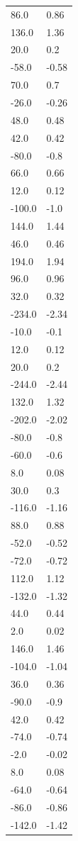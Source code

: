 \begin{longtable}{ll}
86.0 & 0.86 \\
136.0 & 1.36 \\
20.0 & 0.2 \\
-58.0 & -0.58 \\
70.0 & 0.7 \\
-26.0 & -0.26 \\
48.0 & 0.48 \\
42.0 & 0.42 \\
-80.0 & -0.8 \\
66.0 & 0.66 \\
12.0 & 0.12 \\
-100.0 & -1.0 \\
144.0 & 1.44 \\
46.0 & 0.46 \\
194.0 & 1.94 \\
96.0 & 0.96 \\
32.0 & 0.32 \\
-234.0 & -2.34 \\
-10.0 & -0.1 \\
12.0 & 0.12 \\
20.0 & 0.2 \\
-244.0 & -2.44 \\
132.0 & 1.32 \\
-202.0 & -2.02 \\
-80.0 & -0.8 \\
-60.0 & -0.6 \\
8.0 & 0.08 \\
30.0 & 0.3 \\
-116.0 & -1.16 \\
88.0 & 0.88 \\
-52.0 & -0.52 \\
-72.0 & -0.72 \\
112.0 & 1.12 \\
-132.0 & -1.32 \\
44.0 & 0.44 \\
2.0 & 0.02 \\
146.0 & 1.46 \\
-104.0 & -1.04 \\
36.0 & 0.36 \\
-90.0 & -0.9 \\
42.0 & 0.42 \\
-74.0 & -0.74 \\
-2.0 & -0.02 \\
8.0 & 0.08 \\
-64.0 & -0.64 \\
-86.0 & -0.86 \\
-142.0 & -1.42 \\

\end{longtable}
